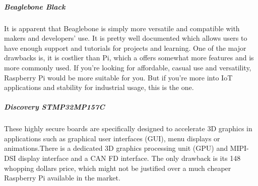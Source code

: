 \documentclass[a4paper,11pt]{article}
\begin{document}
\begin{iotsolution}
\subparagraph{Beaglebone Black}  It is apparent that Beaglebone is simply more versatile and compatible with makers and developers’ use. It is pretty well documented which allows users to have enough support and tutorials for projects and learning. One of the major drawbacks is, it is costlier than Pi, which a offers somewhat more features and is more commonly used.  If you’re looking for affordable, casual use and versatility, Raspberry Pi would be more suitable for you. But if you’re more into IoT applications and stability for industrial usage, this is the one.

\subparagraph{Discovery STMP32MP157C}These highly secure boards are specifically designed to accelerate 3D graphics in applications such as graphical user interfaces (GUI), menu displays or animations.There is a dedicated 3D graphics processing unit (GPU) and MIPI-DSI display interface and a CAN FD interface. The only drawback is its 148 whopping dollars price, which might not be justified over a much cheaper Raspberry Pi available in the market.



\end{iotsolution}
\end{document}
